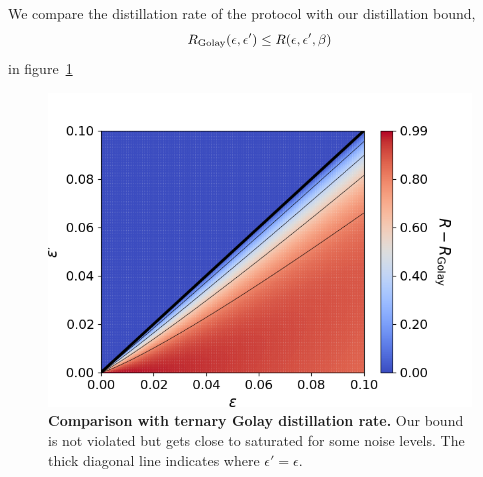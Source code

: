 \documentclass[pra,
aps,
twocolumn,
superscriptaddress,
groupedaddress,
nofootinbib,
reprint
]{revtex4-1}
\begin{document}
We compare the distillation rate of the protocol with our distillation bound, 
\begin{equation}
	R_{\rm{Golay}}(\epsilon, \epsilon') \leq R(\epsilon, \epsilon', \beta)
\end{equation} 
in figure~\cref{fig:prakash_compare}
\begin{figure}[h]
    \centering
    \includegraphics[scale=0.5]{figs/prakash_compare.png}
    \caption{\textbf{Comparison with ternary Golay distillation rate.}
    Our bound is not violated but gets close to saturated for some noise levels.
    The thick diagonal line indicates where $\epsilon' = \epsilon$.
    }
    \label{fig:prakash_compare}
\end{figure}
\end{document}
